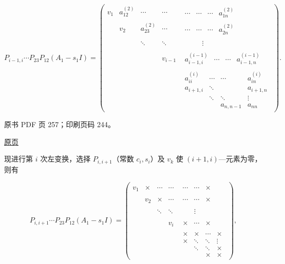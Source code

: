 \[
P_{i-1,i}\cdots P_{23}P_{12}(A_1-s_1I)
=\begin{pmatrix}
v_1&a_{12}^{(2)}&\cdots&\cdots&\begin{matrix}\cdots&\cdots&\cdots&a_{1n}^{(2)}\end{matrix}\\
&v_2&a_{23}^{(2)}&\cdots&\begin{matrix}\cdots&\cdots&\cdots&a_{2n}^{(2)}\end{matrix}\\
&&\ddots&\ddots&\begin{matrix}&&&\vdots\end{matrix}\\
&&&v_{i-1}&\begin{matrix}a_{i-1,i}^{(i-1)}&\cdots&\cdots&a_{i-1,n}^{(i-1)}\end{matrix}\\
&&&&\boxed{\begin{matrix}
a_{ii}^{(i)}&\cdots&\cdots&a_{in}^{(i)}\\
a_{i+1,i}&\ddots&&a_{i+1,n}\\
&\ddots&\ddots&\vdots\\
&&a_{n,n-1}&a_{nn}
\end{matrix}}
\end{pmatrix}.
\]

\clearpage

原书 PDF 页 257；印刷页码 244。

\href{source-images/pdf-257.jpeg}{原页}

现进行第 \(i\) 次左变换，选择 \(P_{i,i+1}\)（常数 \(c_i,s_i\)）及 \(v_k\) 使 \((i+1,i)\)---元素为零，则有

\[
P_{i,i+1}\cdots P_{23}P_{12}(A_1-s_1I)
=\begin{pmatrix}
v_1&\times&\cdots&\cdots&\begin{matrix}\cdots&\cdots&\times\end{matrix}\\
&v_2&\times&\cdots&\begin{matrix}\cdots&\cdots&\times\end{matrix}\\
&&\ddots&\ddots&\begin{matrix}&&\vdots\end{matrix}\\
&&&v_i&\begin{matrix}\times&\cdots&\times\end{matrix}\\
&&&&\boxed{\begin{matrix}
\times&\times&\cdots&\times\\
\times&\ddots&\ddots&\vdots\\
&\ddots&\ddots&\times\\
&&\times&\times
\end{matrix}}
\end{pmatrix},
\]

